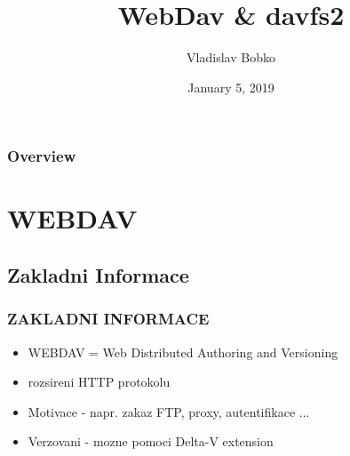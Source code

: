 \documentclass{beamer}
\title[Webdav]{WebDav \& davfs2 }
\author{Vladislav Bobko}
\institute[FIT CVUT]
{
        Ceske Vysoke Uceni Technicke \\
        \medskip
        \textit{bobkovla@fitcvut.cz}
}
\date{January 5, 2019}
\begin{document}
\begin{frame}
\titlepage
\end{frame}

\begin{frame}
\frametitle{Overview}
\tableofcontents
\end{frame}


\section{WEBDAV}

\subsection{Zakladni Informace} %
\begin{frame}
\frametitle{ZAKLADNI INFORMACE }
    \begin{itemize}
        \item WEBDAV = Web Distributed Authoring and Versioning
        \item rozsireni HTTP protokolu
        \item Motivace - napr. zakaz FTP, proxy, autentifikace ...
        \item Verzovani - mozne pomoci Delta-V extension
    \end{itemize}
\end{frame}
\end{document}
